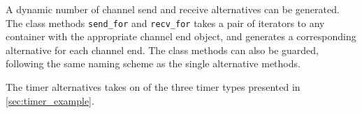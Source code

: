 A dynamic number of channel send and receive alternatives can be generated. The class methods \lstinline[style={CustomC++}]|send_for| and \lstinline[style={CustomC++}]|recv_for| takes a pair of iterators to any container with the appropriate channel end object, and generates a corresponding alternative for each channel end. The class methods can also be guarded, following the same naming scheme as the single alternative methods. 

The timer alternatives takes on of the three timer types presented in \cref{sec:timer_example}. 


